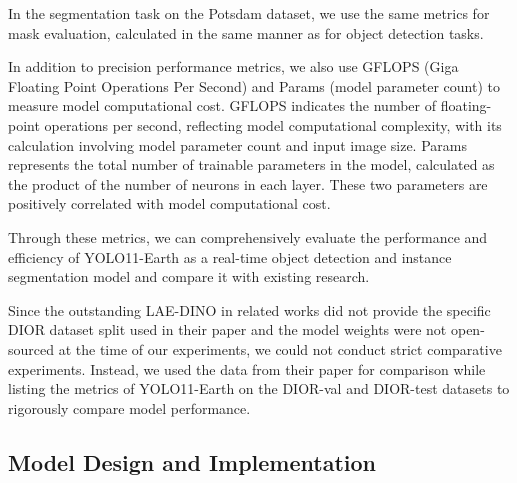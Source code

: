 \documentclass{article}
\begin{document}
In the segmentation task on the Potsdam dataset, 
we use the same metrics for mask evaluation, 
calculated in the same manner as for object detection tasks.

In addition to precision performance metrics, 
we also use GFLOPS (Giga Floating Point Operations Per Second) 
and Params (model parameter count) to measure model computational cost.
GFLOPS indicates the number of floating-point operations per second, 
reflecting model computational complexity, 
with its calculation involving model parameter count and input image size.
Params represents the total number of trainable parameters in the model, 
calculated as the product of the number of neurons in each layer.
These two parameters are positively correlated with model computational cost.

Through these metrics, 
we can comprehensively evaluate the performance and efficiency of YOLO11-Earth 
as a real-time object detection and instance segmentation model 
and compare it with existing research.

Since the outstanding LAE-DINO in related works 
did not provide the specific DIOR dataset split used in their paper 
and the model weights were not open-sourced at the time of our experiments, 
we could not conduct strict comparative experiments.
Instead, we used the data from their paper for comparison 
while listing the metrics of YOLO11-Earth on the DIOR-val and DIOR-test datasets 
to rigorously compare model performance.

\subsection{Model Design and Implementation}
\end{document}

